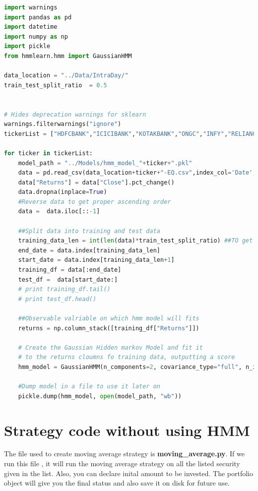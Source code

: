 \documentclass{report}
\begin{document}
\begin{lstlisting}[language=Python]
import warnings
import pandas as pd
import datetime
import numpy as np
import pickle
from hmmlearn.hmm import GaussianHMM

data_location = "../Data/IntraDay/"
train_test_split_ratio  = 0.5


# Hides deprecation warnings for sklearn
warnings.filterwarnings("ignore")
tickerList = ["HDFCBANK","ICICIBANK","KOTAKBANK","ONGC","INFY","RELIANCE","HDFC","LT","IOC","SBIN","HINDUNILVR","MARUTI","ITC","TCS"]

for ticker in tickerList:
	model_path = "../Models/hmm_model_"+ticker+".pkl"
	data = pd.read_csv(data_location+ticker+"-EQ.csv",index_col='Date',names=['Date','Open','High','Low','Close','Volume'],skiprows=1) 
	data["Returns"] = data["Close"].pct_change() 
	data.dropna(inplace=True)
	#Reverse data to get proper ascending order
	data =  data.iloc[::-1]   
	
	##Split data into training and test data
	training_data_len = int(len(data)*train_test_split_ratio) ##TO get training data
	end_date = data.index[training_data_len]
	start_date = data.index[training_data_len+1]
	training_df = data[:end_date]
	test_df =  data[start_date:]
	# print training_df.tail()
	# print test_df.head()
	
	##Observable valriable on which hmm model will fits
	returns = np.column_stack([training_df["Returns"]])
	
	# Create the Gaussian Hidden markov Model and fit it
	# to the returns cloumns fo training data, outputting a score
	hmm_model = GaussianHMM(n_components=2, covariance_type="full", n_iter=1000).fit(returns)
	
	#Dump model in a file to use it later on
	pickle.dump(hmm_model, open(model_path, "wb"))


\end{lstlisting}



\chapter{Strategy code without using HMM}
The file used to create moving average strategy is \textbf{moving\_average.py}.
If we run this file , it will run the moving average strategy on all the listed security given in the list.
Also, you can declare inital amount to be invested. The portfolio object will give you the final status and also save it on disk for future use.
\end{document}

